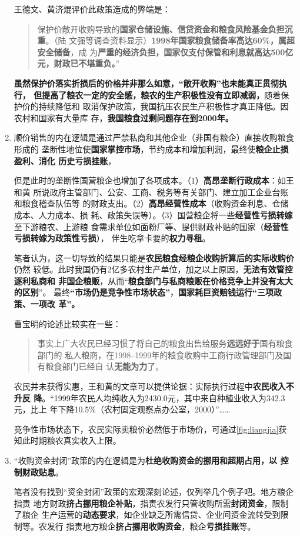 \begin{enumerate}
  王德文、黄济焜评价此政策造成的弊端是：
  \begin{quotation}
    保护价敞开收购导致的\textbf{国家仓储设施、信贷资金和粮食风险基金负担沉重}。（陆
    文强等调查资料显示）\textbf{1998年国家粮食储备率高达60\%，属超安全储备}，成
    为\textbf{严重的经济负担，国家仅支付保管和利息就高达500亿元，财政已不堪重负。}”
  \end{quotation}

  \textbf{虽然保护价落实折损后的价格并非那么如意，“敞开收购”也未能真正贯彻执行，
    但提高了粮农一定的安全感，粮农的生产积极性没有立即减弱，}随着保护价的持续降低和
  取消保护政策，我国抗压农民生产积极性才真正降低。因农村和国家有大量库
  存，\textbf{我国粮食过剩问题存在到2000年。}

\item 顺价销售的内在逻辑是通过严禁私商和其他企业（非国有粮企）直接收购粮食形成的
  垄断性地位使\textbf{国家掌控市场}，节约成本和增加利润，最终使\textbf{粮企止损盈利、消化
    历史亏损挂账}，

  但是此时的垄断性国营粮企也增加了各项成本。（1）\textbf{高昂垄断行政成本}：如王和黄
  所说政府主管部门、公安、工商、税务等有关部门、建立加工企业台账和粮食稽查队伍等
  的财政支出。（2）\textbf{高昂经营性成本}（收购资金利息、仓储成本、人力成本、损
  耗、政策失误等）。（3）国营粮企将一些\textbf{经营性亏损转嫁}至下游粮农、上游粮
  食需求单位如面粉厂等、提供财政补贴的国家（\textbf{经营性亏损转嫁为政策性亏损}），
  伴生吃拿卡要的\textbf{权力寻租}。

  笔者认为，这一切导致的结果只能是\textbf{农民粮食经粮企收购折算后的实际收购价}仍然
  较低。此时我国仍有2亿多农村生产单位，加之以上原因，\textbf{无法有效管控逐利私商和
    非国企粮贩}，从而“\textbf{粮食部门与私商粮贩在价格竞争上并没有太大的区别}”。
  最终\textbf{“市场仍是竞争性市场状态”}，\textbf{国家耗巨资赔钱运行“三项政策、一项改
    革”。}

  曹宝明的论述比较实在一些：
  \begin{quotation}
    事实上广大农民已经习惯了将自己的粮食出售给服务\textbf{远远好于}国有粮食部门的
    私人粮商，在1998--1999年的粮食收购中工商行政管理部门及国有粮食部门已经自
    认\textbf{无能为力}了。\cite{caobaoming01}
  \end{quotation}

  农民并未获得实惠，王和黄的文章可以提供论据：实际执行过程中\textbf{农民收入不升反
    降}。“1999年农民人均纯收入为2430.0元，其中来自种植业收入为342.3元，比上
  年下降10.5\%（农村固定观察点办公室，2000）”……

  竞争性市场状态下，农民实际卖粮价必然低于市场价，可通过\cref{fig:liangjia}获
  知此时期粮农真实收入上限。

\item “收购资金封闭”政策的内在逻辑是为\textbf{杜绝收购资金的挪用和超期占用，以
    控制财政贴息}。

  笔者没有找到“资金封闭”政策的宏观深刻论述，仅列举几个例子吧。地方粮企指责
  地方财政\textbf{挤占挪用粮企补贴}，指责农发行只管收购所需\textbf{封闭资金}，限制了粮企
  生产运营的\textbf{动态要求}，如企业缺乏所需信贷、企业间资金流转受到限制等。农发行
  指责地方粮企\textbf{挤占挪用收购资金}，粮企\textbf{亏损挂账}等。

\end{enumerate}

